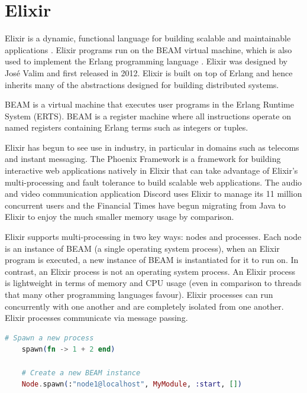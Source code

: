 \chapter{Elixir}
Elixir is a dynamic, functional language for building scalable and maintainable applications \cite{elixir}. Elixir programs run on the BEAM virtual machine\cite{beam}, which is also used to implement the Erlang programming language \cite{erlang}. Elixir was designed by José Valim and first released in 2012. Elixir is built on top of Erlang and hence inherits many of the abstractions designed for building distributed systems.
\par
BEAM is a virtual machine that executes user programs in the Erlang Runtime System (ERTS). BEAM is a register machine where all instructions operate on named registers containing Erlang terms such as integers or tuples.
\par
Elixir has begun to see use in industry, in particular in domains such as telecoms and instant messaging. The Phoenix Framework \cite{phoenix} is a framework for building interactive web applications natively in Elixir that can take advantage of Elixir's multi-processing and fault tolerance to build scalable web applications. The audio and video communication application Discord \cite{discord} uses Elixir to manage its 11 million concurrent users and the Financial Times \cite{ft} have begun migrating from Java to Elixir to enjoy the much smaller memory usage by comparison.
\par
Elixir supports multi-processing in two key ways: nodes and processes. Each node is an instance of BEAM (a single operating system process), when an Elixir program is executed, a new instance of BEAM is instantiated for it to run on. In contrast, an Elixir process is not an operating system process. An Elixir process is lightweight in terms of memory and CPU usage (even in comparison to threads that many other programming languages favour). Elixir processes can run concurrently with one another and are completely isolated from one another. Elixir processes communicate via message passing.
\begin{lstlisting}[language=Elixir, xleftmargin=.2\linewidth, caption={An example of spawn/1 and spawn/4 in Elixir for spawning a new lightweight process and a new Elixir node}]
    # Spawn a new process
    spawn(fn -> 1 + 2 end)

    # Create a new BEAM instance
    Node.spawn(:"node1@localhost", MyModule, :start, [])
\end{lstlisting}
